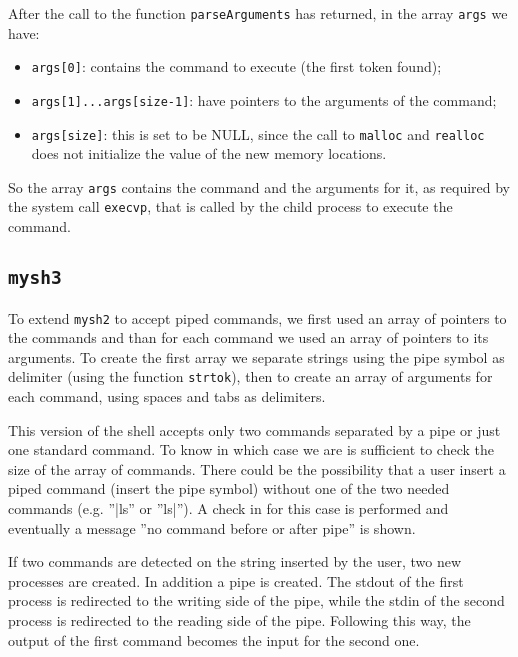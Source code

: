 After the call to the function \texttt{parseArguments} has returned, in the array \texttt{args} we have:
\begin{itemize}
\item \texttt{args[0]}: contains the command to execute (the first token found);
\item \texttt{args[1]...args[size-1]}: have pointers to the arguments of the command;
\item \texttt{args[size]}: this is set to be NULL, since the call to \texttt{malloc} and \texttt{realloc} does not initialize the value of the new memory locations.
\end{itemize}

So the array \texttt{args} contains the command and the arguments for it, as required by the system call \texttt{execvp}, that is called by the child process to execute the command.

\subsection{\texttt{mysh3}}
To extend \texttt{mysh2} to accept piped commands, we first used an array of pointers to the commands and than for each command we used an array of pointers to its arguments. To create the first array we separate strings using the pipe symbol as delimiter (using the function \texttt{strtok}), then to create an array of arguments for each command, using spaces and tabs as delimiters.  \newline

This version of the shell accepts only two commands separated by a pipe or just one standard command. To know in which case we are is sufficient to check the size of the array of commands. There could be the possibility that a user insert a piped command (insert the pipe symbol) without one of the two needed commands (e.g. ''|ls'' or ''ls|''). A check in for this case is performed and eventually a message ''no command before or after pipe'' is shown.\newline

If two commands are detected on the string inserted by the user, two new processes are created. In addition a pipe is created. The stdout of the first process is redirected to the writing side of the pipe, while the stdin of the second process is redirected to the reading side of the pipe. Following this way, the output of the first command becomes the input for the second one. \newline

